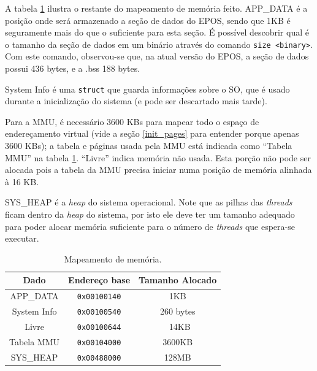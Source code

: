 A tabela \ref{tab:mem} ilustra o restante do mapeamento de memória feito. APP\_DATA é a posição onde será armazenado a seção de dados do EPOS, sendo que 1KB é seguramente mais do que o suficiente para esta seção. É possível descobrir qual é o tamanho da seção de dados em um binário através do comando \verb+size <binary>+. Com este comando, observou-se que, na atual versão do EPOS, a seção de dados possui 436 bytes, e a .bss 188 bytes.

System Info é uma \verb+struct+ que guarda informações sobre o SO, que é usado durante a inicialização do sistema (e pode ser descartado mais tarde).

Para a MMU, é necessário 3600 KBs para mapear todo o espaço de endereçamento virtual (vide a seção \ref{init_pages} para entender porque apenas 3600 KBs); a tabela e páginas usada pela MMU está indicada como ``Tabela MMU'' na tabela \ref{tab:mem}.
``Livre'' indica memória não usada. Esta porção não pode ser alocada pois a tabela da MMU precisa iniciar numa posição de memória alinhada à 16 KB.

SYS\_HEAP é a \emph{heap} do sistema operacional. Note que as pilhas das \emph{threads} ficam dentro da \emph{heap} do sistema, por isto ele deve ter um tamanho adequado para poder alocar memória suficiente para o número de \emph{threads} que espera-se executar.




\begin{table}[ht]
	\centering
	\begin{tabular}{ccc}
		\hline \hline
		Dado & Endereço base & Tamanho Alocado\\[0.5ex]
		\hline
		APP\_DATA		& \verb+0x00100140+ & 1KB\\
		System Info		& \verb+0x00100540+ & 260 bytes\\
		Livre			& \verb+0x00100644+ & ~14KB\\
		Tabela MMU		& \verb+0x00104000+ & 3600KB\\
		SYS\_HEAP		& \verb+0x00488000+ & 128MB\\[1ex]
		\hline
	\end{tabular}
	\caption{Mapeamento de memória.}
	\label{tab:mem}
\end{table}

